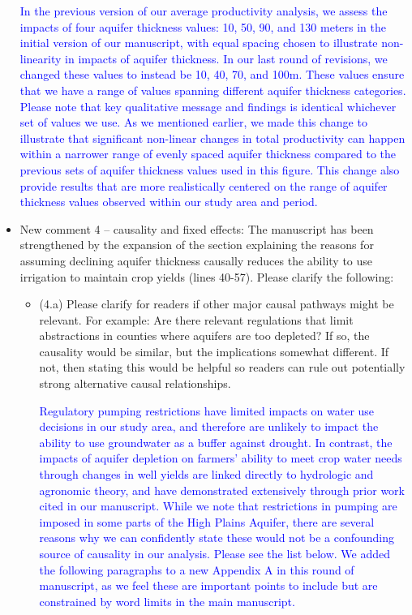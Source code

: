 \documentclass[
]{article}
\begin{document}
\begin{itemize}
    \textcolor{blue}{In the previous version of our average productivity analysis, we assess the impacts of four aquifer thickness values: 10, 50, 90, and 130 meters in the initial version of our manuscript, with equal spacing chosen to illustrate non-linearity in impacts of aquifer thickness. In our last round of revisions, we changed these values to instead be 10, 40, 70, and 100m. These values ensure that we have a range of values spanning different aquifer thickness categories. Please note that key qualitative message and findings is identical whichever set of values we use. As we mentioned earlier, we made this change to illustrate that significant non-linear changes in total productivity can happen within a narrower range of evenly spaced aquifer thickness compared to the previous sets of aquifer thickness values used in this figure. This change also provide results that are more realistically centered on the range of aquifer thickness values observed within our study area and period.} 

\item New comment 4 – causality and fixed effects: The manuscript has been strengthened by the expansion of the section explaining the reasons for assuming declining aquifer thickness causally reduces the ability to use irrigation to maintain crop yields (lines 40-57). Please clarify the following:

  \begin{itemize}
  \item (4.a) Please clarify for readers if other major causal pathways might be relevant. For example: Are there relevant regulations that limit abstractions in counties where aquifers are too depleted? If so, the causality would be similar, but the implications somewhat different. If not, then stating this would be helpful so readers can rule out potentially strong alternative causal relationships.


  \textcolor{blue}{Regulatory pumping restrictions have limited impacts on water use decisions in our study area, and therefore are unlikely to impact the ability to use groundwater as a buffer against drought. In contrast, the impacts of aquifer depletion on farmers' ability to meet crop water needs through changes in well yields are linked directly to hydrologic and agronomic theory, and have demonstrated extensively through prior work cited in our manuscript. While we note that restrictions in pumping are imposed in some parts of the High Plains Aquifer, there are several reasons why we can confidently state these would not be a confounding source of causality in our analysis. Please see the list below. We added the following paragraphs to a new Appendix A in this round of manuscript, as we feel these are important points to include but are constrained by word limits in the main manuscript.}


\end{itemize}
\end{itemize}
\end{document}
